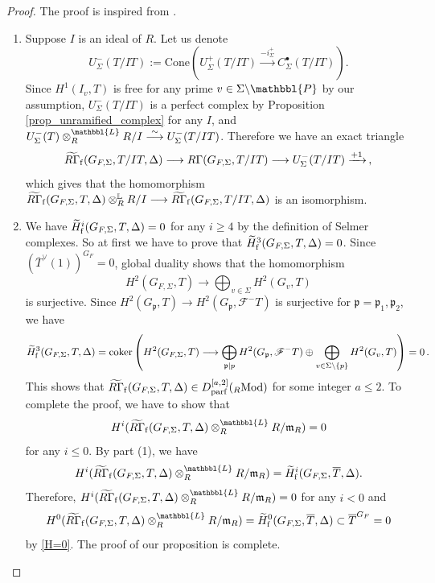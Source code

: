 \documentclass[10pt]{amsart}
\numberwithin{equation}{section}
\theoremstyle{definition}
\theoremstyle{remark} %
\newcommand{\ba}{\backslash}
\newcommand{\scrF}{\mathscr{F}}
\newcommand{\p}{\mathfrak{p}}
\newcommand{\bP}{\mathbbl{P}}
\begin{document}
	\begin{proof}
		The proof is inspired from \cite[Lemma A.2, Corollary A.5]{BS22}.
		\begin{enumerate}[(1)]
			\item  Suppose $I$ is an ideal of $R$. 
			Let us denote
			\[
			U^{-}_{\Sigma}(T/IT) := \mathrm{Cone}\left(U^{+}_{\Sigma}(T/IT) \xrightarrow{-i^+_{\Sigma}} C^{\bullet}_{\Sigma} (T/IT) \right). 
			\]
			Since $H^1(I_v, T)$ is free for any prime $v \in \Sigma \ba \bP$ by our assumption, $U_{\Sigma}^{-}(T/IT)$ is a perfect complex by Proposition \ref{prop_unramified_complex} for any $I$, and 
			$U_{\Sigma}^{-}(T) \otimes_R^{\mathbbl{L}}R/I \stackrel{\sim}{\longrightarrow} U_{\Sigma}^{-}(T/IT)$. 
			Therefore we have an exact triangle 
			\[
			\widetilde{R\Gamma}_{\rm f}(G_{F, \Sigma}, T/IT, \Delta) \longrightarrow R\Gamma(G_{F, \Sigma}, T/IT) \longrightarrow U^{-}_{\Sigma}(T/IT) \xrightarrow{+1}\,,
			\]
			which gives that the homomorphism $\widetilde{R\Gamma}_{\rm f}(G_{F, \Sigma}, T, \Delta) \otimes_R^{\mathbb{L}} R/I \longrightarrow \widetilde{R\Gamma}_{\rm f}(G_{F, \Sigma}, T/IT, \Delta)$ is an isomorphism. 
			
			
			\item
			We have  $\widetilde{H}^{i}_{\rm f}(G_{F, \Sigma}, T, \Delta) = 0$ for any $i \geq 4$ by the definition of Selmer complexes. So at first we have to prove that $\widetilde{H}_{\rm f}^3(G_{F, \Sigma}, T, \Delta) = 0$. 
			Since $(\overline{T}^\vee(1))^{G_F} = 0$, global duality shows that the homomorphism 
			\[
			H^2(G_{F, \Sigma}, T) \longrightarrow \bigoplus_{v \in \Sigma} H^2(G_{v}, T)
			\]
			is surjective. 
			Since $H^2(G_{\p}, T) \longrightarrow H^2(G_{\p}, \scrF^-T)$ is surjective for $ \p =\p_1,\p_2 $, we have 
			\[
			\widetilde{H}_{\rm f}^3(G_{F, \Sigma}, T, \Delta) = \mathrm{coker}\left(H^2(G_{F, \Sigma}, T) \longrightarrow \bigoplus_{\p \mid p} H^2(G_{\p}, \scrF^-T) \oplus \bigoplus_{v \in \Sigma \setminus \{p\}} H^2(G_{v}, T)\right) = 0\,.
			\]
			This shows that $\widetilde{R\Gamma}_{\rm f}(G_{F, \Sigma}, T, \Delta) \in D^{[a,2]}_{\mathrm{parf}}(_{R}\mathrm{Mod})$ 
			for some integer $a \leq 2$. 
			To complete the proof, we have to show that 
			\[
			H^{i}(\widetilde{R\Gamma}_{\rm f}(G_{F, \Sigma}, T, \Delta) \otimes^{\mathbbl{L}}_{R} R/\mathfrak{m}_R) = 0 
			\]
			for any $i \leq 0$. By part (1), we have 
			\[
			H^{i}(\widetilde{R\Gamma}_{\rm f}(G_{F, \Sigma}, T, \Delta) \otimes^{\mathbbl{L}}_{R} R/\mathfrak{m}_R)
			= 
			\widetilde{H}_{\rm f}^i(G_{F, \Sigma}, \overline{T}, \Delta). 
			\]
			Therefore, 
			$H^{i}(\widetilde{R\Gamma}_{\rm f}(G_{F, \Sigma}, T, \Delta) \otimes^{\mathbbl{L}}_{R} R/\mathfrak{m}_R) = 0$ for any $i < 0$ and 
			\[
			H^{0}(\widetilde{R\Gamma}_{\rm f}(G_{F, \Sigma}, T, \Delta) \otimes^{\mathbbl{L}}_{R} R/\mathfrak{m}_R) 
			= \widetilde{H}_{\rm f}^0(G_{F, \Sigma}, \overline{T}, \Delta) \subset \overline{T}^{G_F} = 0
			\]
			by \ref{H=0}. The proof of our proposition is complete. 
		\end{enumerate}
	\end{proof}
\end{document}
